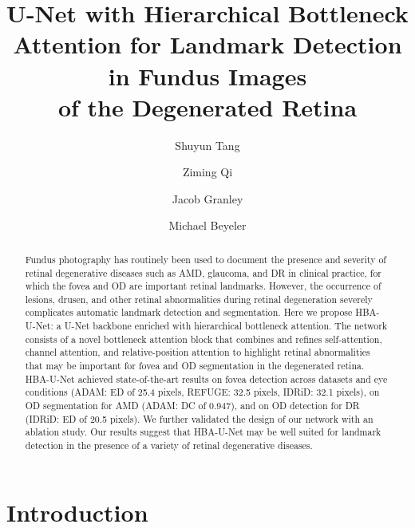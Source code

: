 \documentclass[hidelinks,runningheads]{llncs}
\begin{document}
\title{
U-Net with Hierarchical Bottleneck Attention for Landmark Detection in Fundus Images \\ of the Degenerated Retina}

\author{Shuyun Tang \and
Ziming Qi \and
Jacob Granley \and
Michael Beyeler}
\maketitle  \begin{abstract}
Fundus photography has routinely been used to document the presence and severity of retinal degenerative diseases such as \acf{AMD}, glaucoma, and \acf{DR} in clinical practice, for which the fovea and \acf{OD} are important retinal landmarks.
However, the occurrence of lesions, drusen, and other retinal abnormalities during retinal degeneration severely complicates automatic landmark detection and segmentation.
Here we propose HBA-U-Net: a U-Net backbone enriched with hierarchical bottleneck attention. The network consists of a novel bottleneck attention block that combines and refines self-attention, channel attention, and relative-position attention to highlight retinal abnormalities that may be important for fovea and OD segmentation in the degenerated retina.
HBA-U-Net achieved state-of-the-art results on fovea detection across datasets and eye conditions (ADAM: \acf{ED} of 25.4 pixels, REFUGE: 32.5 pixels, IDRiD: 32.1 pixels), on OD segmentation for AMD (ADAM: \acf{DC} of 0.947), and on OD detection for DR (IDRiD: ED of 20.5 pixels).
We further validated the design of our network with an ablation study.
Our results suggest that HBA-U-Net may be well suited for landmark detection in the presence of a variety of retinal degenerative diseases.






\end{abstract}
\section{Introduction}
\end{document}
